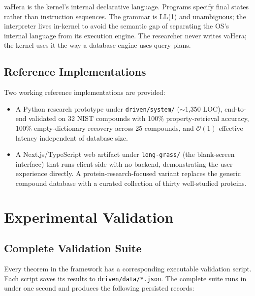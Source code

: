 \documentclass[twocolumn,11pt,a4paper]{article}
\begin{document}
vaHera is the kernel's internal declarative language. Programs specify final states rather than instruction sequences. The grammar is LL(1) and unambiguous; the interpreter lives in-kernel to avoid the semantic gap of separating the OS's internal language from its execution engine. The researcher never writes vaHera; the kernel uses it the way a database engine uses query plans.

\subsection{Reference Implementations}

Two working reference implementations are provided:
\begin{itemize}[leftmargin=*,itemsep=1pt]
\item A Python research prototype under \texttt{driven/system/} ($\sim$1,350 LOC), end-to-end validated on 32 NIST compounds with 100\% property-retrieval accuracy, 100\% empty-dictionary recovery across 25 compounds, and $\mathcal{O}(1)$ effective latency independent of database size.
\item A Next.js/TypeScript web artifact under \texttt{long-grass/} (the blank-screen interface) that runs client-side with no backend, demonstrating the user experience directly. A protein-research-focused variant replaces the generic compound database with a curated collection of thirty well-studied proteins.
\end{itemize}


\section{Experimental Validation}
\label{sec:validation}

\subsection{Complete Validation Suite}

Every theorem in the framework has a corresponding executable validation script. Each script saves its results to \texttt{driven/data/*.json}. The complete suite runs in under one second and produces the following persisted records:
\end{document}
